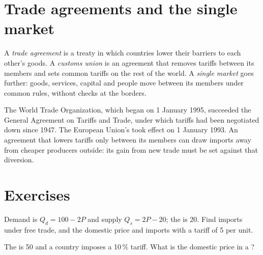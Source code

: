 \section{Trade agreements and the single market}\label{sec:g12:trade-and-trade-policy:agreements}

\begin{definition}\label{def:g12:trade-and-trade-policy:trade-agreement}
A \emph{trade agreement} is a treaty in which countries lower their barriers to each other's goods. A \emph{customs union}\label{def:g12:trade-and-trade-policy:customs-union} is an agreement that removes tariffs between its members and sets common tariffs on the rest of the
world. A \emph{single market}\label{def:g12:trade-and-trade-policy:single-market} goes further: goods, services, capital and people move
between its members under common rules, without checks at the borders.
\end{definition}

The World Trade Organization, which began on 1 January 1995, succeeded the General Agreement on Tariffs and Trade, under which tariffs had been negotiated down since 1947. The
European Union's  took effect on 1 January 1993. An agreement that lowers tariffs only between its members can draw imports away from cheaper producers outside:
its gain from new trade must be set against that diversion.

\section{Exercises}

\begin{exercise}[$\star$]\label{exo:g12:trade-and-trade-policy:1}
Demand is $Q_d = 100 - 2P$ and supply $Q_s = 2P - 20$; the  is 20. Find imports under free trade, and the domestic price and imports with a tariff of 5 per
unit.
\end{exercise}

\begin{exercise}[$\star$]\label{exo:g12:trade-and-trade-policy:2}
The  is 50 and a country imposes a 10\,\% tariff. What is the domestic price in a ?
\end{exercise}

